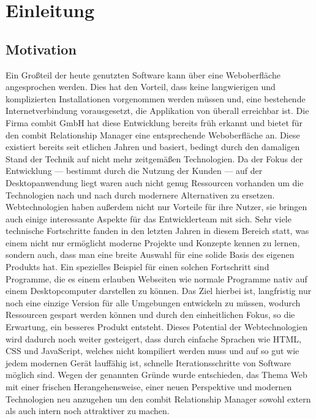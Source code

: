 \chapter{Einleitung}\label{chap:introduction}

\section{Motivation}
Ein Großteil der heute genutzten Software kann über eine Weboberfläche angesprochen werden. Dies hat den Vorteil, dass keine langwierigen und komplizierten Installationen vorgenommen werden müssen und, eine bestehende Internetverbindung vorausgesetzt, die Applikation von überall erreichbar ist. Die Firma combit GmbH hat diese Entwicklung bereits früh erkannt und bietet für den combit Relationship Manager eine entsprechende Weboberfläche an. Diese existiert bereits seit etlichen Jahren und basiert, bedingt durch den damaligen Stand der Technik auf nicht mehr zeitgemäßen Technologien. Da der Fokus der Entwicklung --- bestimmt durch die Nutzung der Kunden --- auf der Desktopanwendung liegt waren auch nicht genug Ressourcen vorhanden um die Technologien nach und nach durch modernere Alternativen zu ersetzen.
Webtechnologien haben außerdem nicht nur Vorteile für ihre Nutzer, sie bringen auch einige interessante Aspekte für das Entwicklerteam mit sich. Sehr viele technische Fortschritte fanden in den letzten Jahren in diesem Bereich statt, was einem nicht nur ermöglicht moderne Projekte und Konzepte kennen zu lernen, sondern auch, dass man eine breite Auswahl für eine solide Basis des eigenen Produkts hat. Ein spezielles Beispiel für einen solchen Fortschritt sind Programme, die es einem erlauben Webseiten wie normale Programme nativ auf einem Desktopcomputer darstellen zu können. Das Ziel hierbei ist, langfristig nur noch eine einzige Version für alle Umgebungen entwickeln zu müssen, wodurch Ressourcen gespart werden können und durch den einheitlichen Fokus, so die Erwartung, ein besseres Produkt entsteht. Dieses Potential der Webtechnologien wird dadurch noch weiter gesteigert, dass durch einfache Sprachen wie HTML, CSS und JavaScript, welches nicht kompiliert werden muss und auf so gut wie jedem modernen Gerät lauffähig ist, schnelle Iterationsschritte von Software möglich sind.
Wegen der genannten Gründe wurde entschieden, das Thema Web mit einer frischen Herangehensweise, einer neuen Perspektive und modernen Technologien neu anzugehen um den combit Relationship Manager sowohl extern als auch intern noch attraktiver zu machen.

